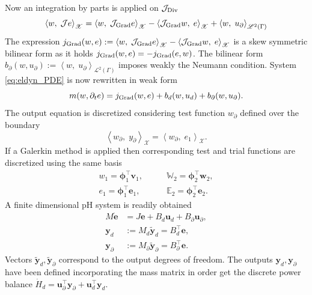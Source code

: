 Now an integration by parts is applied on $\mathcal{J}_{\operatorname*{Div}}$
\begin{equation}
\left\langle w, \; \mathcal{J} e \right\rangle_{\mathscr{X}} = \left\langle w, \; \mathcal{J}_{\operatorname*{Grad}} e \right\rangle_{\mathscr{X}} - \left\langle \mathcal{J}_{\operatorname*{Grad}} w, \; e \right\rangle_{\mathscr{X}} + \left\langle w, \; u_\partial \right\rangle_{\mathscr{L}^2(\Gamma)}
\end{equation}
The expression $j_{\operatorname*{Grad}}(w, e) :=\left\langle w, \; \mathcal{J}_{\operatorname*{Grad}} e \right\rangle_{\mathscr{X}} - \left\langle \mathcal{J}_{\operatorname*{Grad}} w, \; e \right\rangle_{\mathscr{X}}$ is a skew symmetric bilinear form as it holds $j_{\operatorname*{Grad}}(w, e)=-j_{\operatorname*{Grad}}(e, w)$. The bilinear form $b_{\partial}(w, u_\partial) := \left\langle w, \; u_\partial \right\rangle_{\mathscr{L}^2(\Gamma)}$ imposes weakly the Neumann condition. System \eqref{eq:eldyn_PDE} is now rewritten in weak form
\begin{equation}
m(w, \partial_t e) = j_{\operatorname*{Grad}}(w, e) + b_d(w, u_d) + b_{\partial}(w, u_\partial).
\end{equation}
The output equation is discretized considering test function $w_\partial$ defined over the boundary
\begin{equation}
\left\langle w_\partial, \; y_\partial \right\rangle_{\mathscr{X}} = \left\langle w_\partial, \; e_1 \right\rangle_{\mathscr{X}}.
\end{equation}
If a Galerkin method is applied then corresponding test and trial functions are discretized using the same basis
\begin{equation*}
\begin{aligned}
w_1 = \bm{\phi}_1^\top \bm{v}_1, \\
e_1 = \bm{\phi}_1^\top \bm{e}_1, 
\end{aligned} \qquad
\begin{aligned}
\mathbb{W}_2 = \bm{\phi}_2^\top \bm{w}_2, \\
\mathbb{E}_2 = \bm{\phi}_2^\top \bm{e}_2. 
\end{aligned}
\end{equation*}
A finite dimensional pH system is readily obtained
\begin{equation}
\begin{aligned}
{M} \dot{\bm{e}} &= J \bm{e} + {B}_d \bm{u}_d + {B}_\partial \bm{u}_\partial, \\
\bm{y}_d &:= {M}_d \widetilde{\bm{y}}_d = {B}_d^\top \bm{e},  \\
\bm{y}_\partial &:= {M}_\partial \widetilde{\bm{y}}_\partial = {B}_\partial^\top \bm{e}.
\end{aligned}
\end{equation}
Vectors $\widetilde{\bm{y}}_d, \widetilde{\bm{y}}_\partial$ correspond to the output degrees of freedom. The outputs $\bm{y}_d, \bm{y}_\partial$ have been defined incorporating the mass matrix in order get the discrete power balance $\dot{H}_d = \bm{u}_\partial^\top \bm{y}_\partial + \bm{u}_d^\top \bm{y}_d$.

